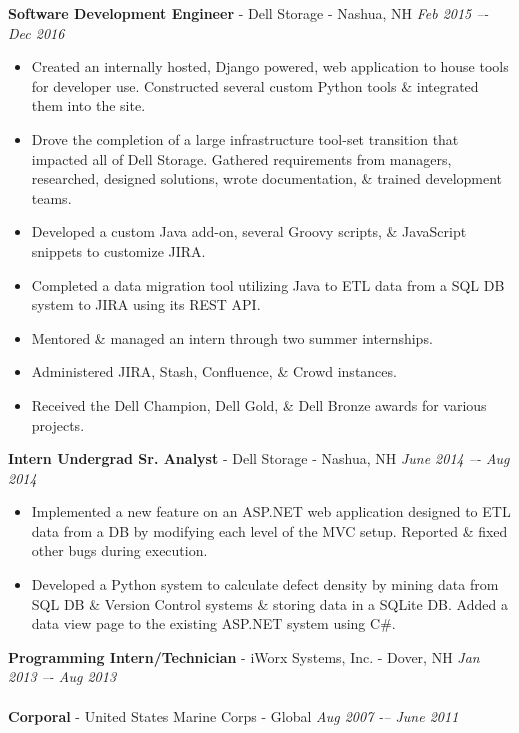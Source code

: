 \documentclass[a4paper,10pt]{article}
\begin{document}
\noindent
\textbf{Software Development Engineer} - Dell Storage - Nashua, NH
\hfill
\textit{Feb 2015 –- Dec 2016}
\begin{itemize}
\setlength\itemsep{0.0em}
\item Created an internally hosted, Django powered, web application to house tools for developer use. Constructed several custom Python tools \& integrated them into the site.
\item Drove the completion of a large infrastructure tool-set transition that impacted all of Dell Storage. Gathered requirements from managers, researched, designed solutions, wrote documentation, \& trained development teams.
\item Developed a custom Java add-on, several Groovy scripts, \& JavaScript snippets to customize JIRA.
\item Completed a data migration tool utilizing Java to ETL data from a SQL DB system to JIRA using its REST API.
\item Mentored \& managed an intern through two summer internships.
\item Administered JIRA, Stash, Confluence, \& Crowd instances.
\item Received the Dell Champion, Dell Gold, \& Dell Bronze awards for various projects.
\end{itemize}
\vspace{\baselineskip}
\textbf{Intern Undergrad Sr. Analyst} - Dell Storage - Nashua, NH
\hfill
\textit{June 2014 –- Aug 2014}
\begin{itemize}
\setlength\itemsep{0.0em}
\item Implemented a new feature on an ASP.NET web application designed to ETL data from a DB by modifying each level of the MVC setup. Reported \& fixed other bugs during execution.
\item Developed a Python system to calculate defect density by mining data from SQL DB \& Version Control systems \& storing data in a SQLite DB. Added a data view page to the existing ASP.NET system using C\#.
\end{itemize}
\vspace{\baselineskip}
\textbf{Programming Intern/Technician} - iWorx Systems, Inc. - Dover, NH
\hfill
\textit{Jan 2013 –- Aug 2013}\\\\
\textbf{Corporal} - United States Marine Corps - Global
\hfill
\textit{Aug 2007 -– June 2011}\\
\\
\end{document}
